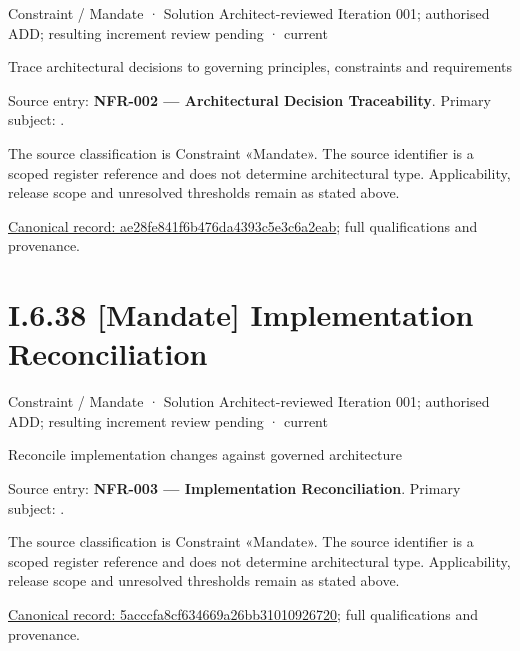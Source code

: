 \label{element:ae28fe841f6b476da4393c5e3c6a2eab}
{\small Constraint / Mandate · Solution Architect-reviewed Iteration 001; authorised ADD; resulting increment review pending · current}\par

Trace architectural decisions to governing principles, constraints and requirements



Source entry: \textbf{NFR-002 — Architectural Decision Traceability}. Primary subject: \texttt{}.



The source classification is Constraint «Mandate». The source identifier is a scoped register reference and does not determine architectural type. Applicability, release scope and unresolved thresholds remain as stated above.


{\footnotesize \href{../../../../../../../../continuum/motivation/constraint/mandate/ae28fe841f6b476da4393c5e3c6a2eab.md}{Canonical record: ae28fe841f6b476da4393c5e3c6a2eab}; full qualifications and provenance.}\par
\section*{I.6.38 [Mandate] Implementation Reconciliation}
\label{navigation:I.6.38}

\label{element:5acccfa8cf634669a26bb31010926720}
{\small Constraint / Mandate · Solution Architect-reviewed Iteration 001; authorised ADD; resulting increment review pending · current}\par

Reconcile implementation changes against governed architecture



Source entry: \textbf{NFR-003 — Implementation Reconciliation}. Primary subject: \texttt{}.



The source classification is Constraint «Mandate». The source identifier is a scoped register reference and does not determine architectural type. Applicability, release scope and unresolved thresholds remain as stated above.


{\footnotesize \href{../../../../../../../../continuum/motivation/constraint/mandate/5acccfa8cf634669a26bb31010926720.md}{Canonical record: 5acccfa8cf634669a26bb31010926720}; full qualifications and provenance.}\par
